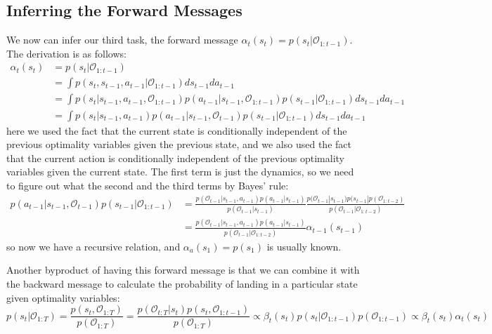 \subsection{Inferring the Forward Messages}
We now can infer our third task, the forward message $\alpha_t(s_t) = p(s_t|\mathcal{O}_{1:t-1})$. The derivation is as follows:
\begin{align*}
    \alpha_t(s_t) &= p(s_t|\mathcal{O}_{1:t-1})\\
    &= \int p(s_t,s_{t-1},a_{t-1}|\mathcal{O}_{1:t-1})ds_{t-1}da_{t-1}\\
    &= \int p(s_t|s_{t-1},a_{t-1},\mathcal{O}_{1:t-1})p(a_{t-1}|s_{t-1},\mathcal{O}_{1:t-1})p(s_{t-1}|\mathcal{O}_{1:t-1})ds_{t-1}da_{t-1}\\
    &= \int p(s_t|s_{t-1},a_{t-1})p(a_{t-1}|s_{t-1},\mathcal{O}_{t-1})p(s_{t-1}|\mathcal{O}_{1:t-1})ds_{t-1}da_{t-1}
\end{align*}
here we used the fact that the current state is conditionally independent of the previous optimality variables given the previous state, and we also used the fact that the current action is conditionally independent of the previous optimality variables given the current state. The first term is just the dynamics, so we need to figure out what the second and the third terms by Bayes' rule:
\begin{align*}
p(a_{t-1}|s_{t-1},\mathcal{O}_{t-1})p(s_{t-1}|\mathcal{O}_{1:t-1}) &= \frac{p(\mathcal{O}_{t-1}|s_{t-1},a_{t-1})p(a_{t-1}|s_{t-1})}{p(\mathcal{O}_{t-1}|s_{t-1})}\frac{p(\mathcal{O}_{t-1}|s_{t-1})p(s_{t-1}|p(\mathcal{O}_{1:t-2})}{p(\mathcal{O}_{t-1}|\mathcal{O}_{1:t-2})}\\
&=\frac{p(\mathcal{O}_{t-1}|s_{t-1},a_{t-1})p(a_{t-1}|s_{t-1})}{p(\mathcal{O}_{t-1}|\mathcal{O}_{1:t-2})}\alpha_{t-1}(s_{t-1})
\end{align*}
so now we have a recursive relation, and $\alpha_a(s_1) = p(s_1)$ is usually known. 

Another byproduct of having this forward message is that we can combine it with the backward message to calculate the probability of landing in a particular state given optimality variables:
\[
p(s_t|\mathcal{O}_{1:T})= \frac{p(s_t,\mathcal{O}_{1:T})}{p(\mathcal{O}_{1:T})} = \frac{p(\mathcal{O}_{t:T}|s_t)p(s_t,\mathcal{O}_{1:t-1})}{p(\mathcal{O}_{1:T})} \propto \beta_t(s_t)p(s_t|\mathcal{O}_{1:t-1})p(\mathcal{O}_{1:t-1})\propto\beta_t(s_t)\alpha_t(s_t)
\]

